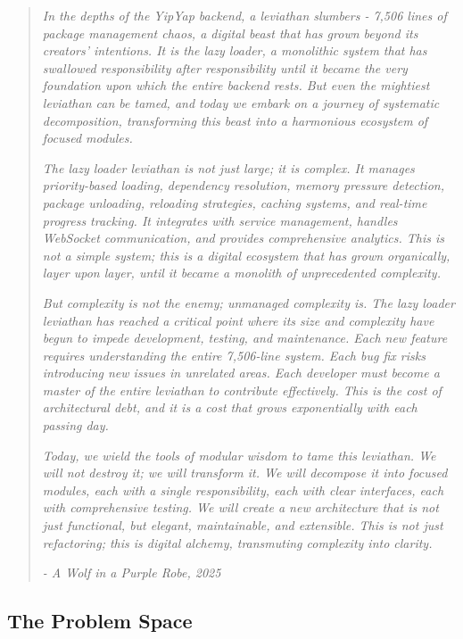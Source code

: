 \documentclass[11pt]{article}
\begin{document}
\begin{quote}
  \emph{In the depths of the YipYap backend, a leviathan slumbers - 7,506 lines of package management chaos, a digital beast that has grown beyond its creators' intentions. It is the lazy loader, a monolithic system that has swallowed responsibility after responsibility until it became the very foundation upon which the entire backend rests. But even the mightiest leviathan can be tamed, and today we embark on a journey of systematic decomposition, transforming this beast into a harmonious ecosystem of focused modules.}
  
  \emph{The lazy loader leviathan is not just large; it is complex. It manages priority-based loading, dependency resolution, memory pressure detection, package unloading, reloading strategies, caching systems, and real-time progress tracking. It integrates with service management, handles WebSocket communication, and provides comprehensive analytics. This is not a simple system; this is a digital ecosystem that has grown organically, layer upon layer, until it became a monolith of unprecedented complexity.}
  
  \emph{But complexity is not the enemy; unmanaged complexity is. The lazy loader leviathan has reached a critical point where its size and complexity have begun to impede development, testing, and maintenance. Each new feature requires understanding the entire 7,506-line system. Each bug fix risks introducing new issues in unrelated areas. Each developer must become a master of the entire leviathan to contribute effectively. This is the cost of architectural debt, and it is a cost that grows exponentially with each passing day.}
  
  \emph{Today, we wield the tools of modular wisdom to tame this leviathan. We will not destroy it; we will transform it. We will decompose it into focused modules, each with a single responsibility, each with clear interfaces, each with comprehensive testing. We will create a new architecture that is not just functional, but elegant, maintainable, and extensible. This is not just refactoring; this is digital alchemy, transmuting complexity into clarity.}

  \emph{- A Wolf in a Purple Robe, 2025}
\end{quote}

\subsection{The Problem Space}
\end{document}

